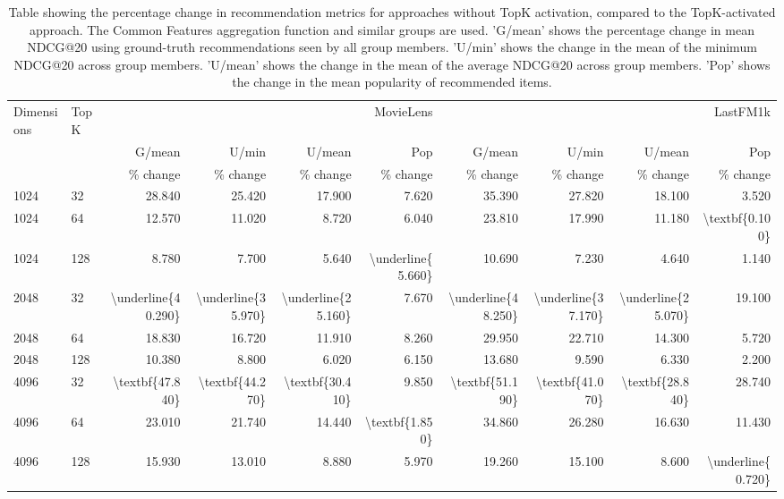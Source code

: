 \begin{table}
\caption{Table showing the percentage change in recommendation metrics for approaches without TopK activation, compared to the TopK-activated approach. The Common Features aggregation function and similar groups are used. 'G/mean' shows the percentage change in mean NDCG@20 using ground-truth recommendations seen by all group members. 'U/min' shows the change in the mean of the minimum NDCG@20 across group members. 'U/mean' shows the change in the mean of the average NDCG@20 across group members. 'Pop' shows the change in the mean popularity of recommended items.}
\label{tab:activation:recommendation:common-features:sim}
\begin{tabular}{ll|rrrr|rrrr}
\toprule
Dimensions & TopK & \multicolumn{4}{r}{MovieLens} & \multicolumn{4}{r}{LastFM1k} \\
 &  & G/mean & U/min & U/mean & Pop & G/mean & U/min & U/mean & Pop \\
 &  & \% change & \% change & \% change & \% change & \% change & \% change & \% change & \% change \\
\midrule
1024 & 32 & 28.840 & 25.420 & 17.900 & 7.620 & 35.390 & 27.820 & 18.100 & 3.520 \\
1024 & 64 & 12.570 & 11.020 & 8.720 & 6.040 & 23.810 & 17.990 & 11.180 & \textbackslash textbf\{0.100\} \\
1024 & 128 & 8.780 & 7.700 & 5.640 & \textbackslash underline\{5.660\} & 10.690 & 7.230 & 4.640 & 1.140 \\
2048 & 32 & \textbackslash underline\{40.290\} & \textbackslash underline\{35.970\} & \textbackslash underline\{25.160\} & 7.670 & \textbackslash underline\{48.250\} & \textbackslash underline\{37.170\} & \textbackslash underline\{25.070\} & 19.100 \\
2048 & 64 & 18.830 & 16.720 & 11.910 & 8.260 & 29.950 & 22.710 & 14.300 & 5.720 \\
2048 & 128 & 10.380 & 8.800 & 6.020 & 6.150 & 13.680 & 9.590 & 6.330 & 2.200 \\
4096 & 32 & \textbackslash textbf\{47.840\} & \textbackslash textbf\{44.270\} & \textbackslash textbf\{30.410\} & 9.850 & \textbackslash textbf\{51.190\} & \textbackslash textbf\{41.070\} & \textbackslash textbf\{28.840\} & 28.740 \\
4096 & 64 & 23.010 & 21.740 & 14.440 & \textbackslash textbf\{1.850\} & 34.860 & 26.280 & 16.630 & 11.430 \\
4096 & 128 & 15.930 & 13.010 & 8.880 & 5.970 & 19.260 & 15.100 & 8.600 & \textbackslash underline\{0.720\} \\
\bottomrule
\end{tabular}
\end{table}
